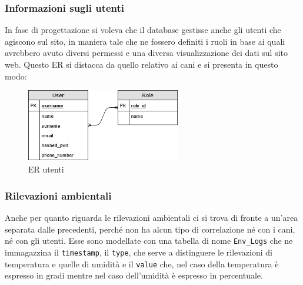      \subsubsection{Informazioni sugli utenti}
     In fase di progettazione si voleva che il database gestisse anche gli utenti che agiscono sul sito, in maniera tale che ne fossero definiti i ruoli in base ai quali avrebbero avuto diversi permessi e una diversa visualizzazione dei dati sul sito web.
     Questo ER si distacca da quello relativo ai cani e si presenta in questo modo:
         \begin{figure}[H]
        \caption{ER utenti}
        \label{fig:userER}
        \centering
        \includegraphics[width=0.6\textwidth]{DrawIo/UserER.png}
    \end{figure}
    
    \subsubsection{Rilevazioni ambientali}
    Anche per quanto riguarda le rilevazioni ambientali ci si trova di fronte a un'area separata dalle precedenti, perché non ha alcun tipo di correlazione né con i cani, né con gli utenti. Esse sono modellate con una tabella di nome \texttt{Env\_Logs} che ne immagazzina il \texttt{timestamp}, il \texttt{type}, che serve a distinguere le rilevazioni di temperatura e quelle di umidità e il \texttt{value} che, nel caso della temperatura è espresso in gradi mentre nel caso dell'umidità è espresso in percentuale. 

